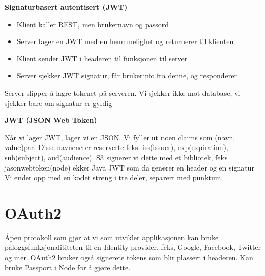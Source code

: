 \documentclass{article}
\begin{document}
\begin{flushleft}
    \textbf{Signaturbasert autentisert (JWT)}
    \begin{itemize}
        \item Klient kaller REST, men brukernavn og passord
        \item Server lager en JWT med en henmmelighet og returnerer til klienten
        \item Klient sender JWT i headeren til funksjonen til server 
        \item Server sjekker JWT signatur, får brukerinfo fra denne, og responderer
    
    \end{itemize}
    Server slipper å lagre tokenet på serveren. Vi sjekker ikke mot database, vi sjekker bare om signatur er gyldig\par 
    \bigskip 

    \textbf{JWT (JSON Web Token)}\par 
    Når vi lager JWT, lager vi en JSON. Vi fyller ut noen claims som (navn, value)par.
    Disse navnene er reserverte feks. iss(issuer), exp(expiration), sub(subject), aud(audience).
    Så signerer vi dette med et bibliotek, feks jasonwebtoken(node) ekker Java JWT som da generer en header og en signatur
    Vi ender opp med en kodet streng i tre deler, separert med punktum. 


    \section{OAuth2}

    Åpen protokoll som gjør at vi som utvikler applikasjonen kan bruke påloggsfunksjonalititeten til en Identity provider,
    feks, Google, Facebook, Twitter og mer.
    OAuth2 bruker også signerete tokens som blir plassert i headeren. 
    Kan bruke Passport i Node for å gjøre dette. 
    

\end{flushleft}    
\end{document}
